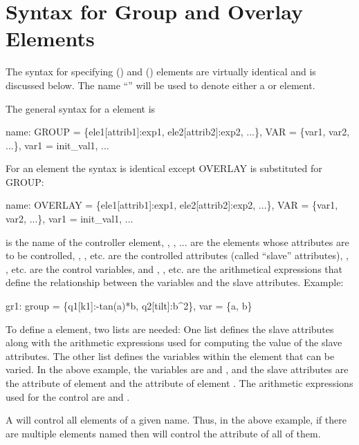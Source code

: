 \section{Syntax for Group and Overlay Elements}
\label{s:go.syntax}

The syntax for specifying  () and 
() elements are virtually identical and is discussed
below. The name ``'' will be used to denote either a
 or  element.

The general syntax for a  element is
\begin{example}
  name: GROUP = \{ele1[attrib1]:exp1, ele2[attrib2]:exp2, ...\}, 
                 VAR = \{var1, var2, ...\}, var1 = init_val1, ...
\end{example}
For an  element the syntax is identical except OVERLAY is
substituted for GROUP:
\begin{example}
  name: OVERLAY = \{ele1[attrib1]:exp1, ele2[attrib2]:exp2, ...\}, 
                 VAR = \{var1, var2, ...\}, var1 = init_val1, ...
\end{example}
 is the name of the controller element, , ,
... are the elements whose attributes are to be controlled,
, , etc. are the controlled attributes (called
``slave'' attributes), , , etc. are the control
variables, and , , etc. are the arithmetical
expressions that define the relationship between the variables and the
slave attributes. Example:
\begin{example}
  gr1: group = \{q1[k1]:-tan(a)*b, q2[tilt]:b^2\}, var = \{a, b\}
\end{example}

To define a  element, two lists are needed: One list
defines the slave attributes along with the arithmetic expressions
used for computing the value of the slave attributes. The other list
defines the variables within the  element that can be
varied. In the above example, the variables are  and , and
the slave attributes are the  attribute of element  and
the  attribute of element . The arithmetic expressions
used for the control are  and .

A  will control all elements of a given name. Thus, in
the above example, if there are multiple elements named 
then  will control the   attribute of all of them.

